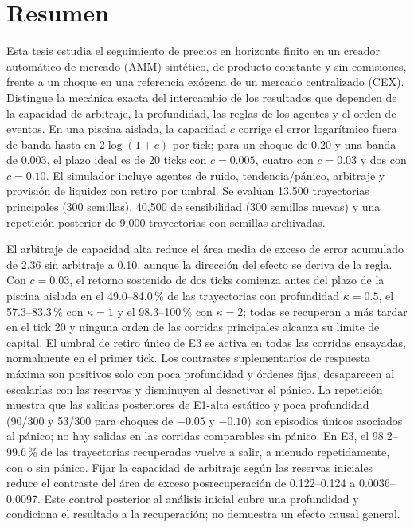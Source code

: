 \section{Resumen}

Esta tesis estudia el seguimiento de precios en horizonte finito en un creador automático de mercado (AMM) sintético, de producto constante y sin comisiones, frente a un choque en una referencia exógena de un mercado centralizado (CEX). Distingue la mecánica exacta del intercambio de los resultados que dependen de la capacidad de arbitraje, la profundidad, las reglas de los agentes y el orden de eventos. En una piscina aislada, la capacidad $c$ corrige el error logarítmico fuera de banda hasta en $2\log(1+c)$ por tick; para un choque de 0.20 y una banda de 0.003, el plazo ideal es de 20 ticks con $c=0.005$, cuatro con $c=0.03$ y dos con $c=0.10$. El simulador incluye agentes de ruido, tendencia/pánico, arbitraje y provisión de liquidez con retiro por umbral. Se evalúan 13,500 trayectorias principales (300 semillas), 40,500 de sensibilidad (300 semillas nuevas) y una repetición posterior de 9,000 trayectorias con semillas archivadas.

El arbitraje de capacidad alta reduce el área media de exceso de error acumulado de 2.36 sin arbitraje a 0.10, aunque la dirección del efecto se deriva de la regla. Con $c=0.03$, el retorno sostenido de dos ticks comienza antes del plazo de la piscina aislada en el 49.0--84.0\,\% de las trayectorias con profundidad $\kappa=0.5$, el 57.3--83.3\,\% con $\kappa=1$ y el 98.3--100\,\% con $\kappa=2$; todas se recuperan a más tardar en el tick 20 y ninguna orden de las corridas principales alcanza su límite de capital. El umbral de retiro único de E3 se activa en todas las corridas ensayadas, normalmente en el primer tick. Los contrastes suplementarios de respuesta máxima son positivos solo con poca profundidad y órdenes fijas, desaparecen al escalarlas con las reservas y disminuyen al desactivar el pánico. La repetición muestra que las salidas posteriores de E1-alta estático y poca profundidad (90/300 y 53/300 para choques de $-0.05$ y $-0.10$) son episodios únicos asociados al pánico; no hay salidas en las corridas comparables sin pánico. En E3, el 98.2--99.6\,\% de las trayectorias recuperadas vuelve a salir, a menudo repetidamente, con o sin pánico. Fijar la capacidad de arbitraje según las reservas iniciales reduce el contraste del área de exceso posrecuperación de 0.122--0.124 a 0.0036--0.0097. Este control posterior al análisis inicial cubre una profundidad y condiciona el resultado a la recuperación; no demuestra un efecto causal general.

